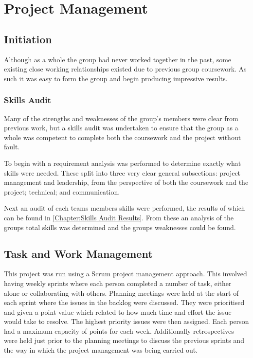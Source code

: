\chapter{Project Management} 
\label{Chapter: Project Management}

\section{Initiation} 
\label{Section:Initiation}

Although as a whole the group had never worked together in the past, some existing close working relationships existed due to previous group coursework. As such it was easy to form the group and begin producing impressive results.

\subsection{Skills Audit} 
\label{Section:Skills Audit}

Many of the strengths and weaknesses of the group's members were clear from previous work, but a skills audit was undertaken to ensure that the group as a whole was competent to complete both the coursework and the project without fault.

To begin with a requirement analysis was performed to determine exactly what skills were needed. These split into three very clear general subsections: project management and leadership, from the perspective of both the coursework and the project; technical; and communication. 

Next an audit of each teams members skills were performed, the results of which can be found in \autoref{Chapter:Skills Audit Results}. From these an analysis of the groups total skills was determined and the groups weaknesses could be found.

\section{Task and Work Management} 
\label{Section:Task and Work Management}

This project was run using a Scrum project management approach. This involved having weekly sprints where each person completed a number of task, either alone or collaborating with others. Planning meetings were held at the start of each sprint where the issues in the backlog were discussed. They were prioritised and given a point value which related to how much time and effort the issue would take to resolve. The highest priority issues were then assigned. Each person had a maximum capacity of points for each week. Additionally retrospectives were held just prior to the planning meetings to discuss the previous sprints and the way in which the project management was being carried out.

